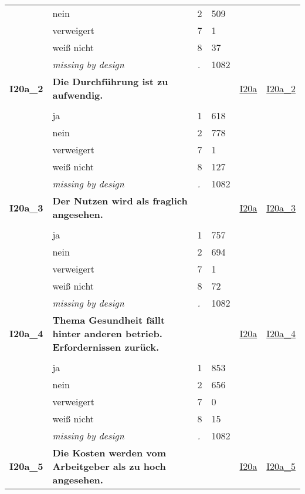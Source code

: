 \begin{longtable}{| L{2.45cm} | L{6cm} | C{1.5cm} | R{1cm} | C{2.25cm} | C{2.25cm} |}
   & nein & 2 & 509 &  &  \\ 
   & verweigert & 7 & 1 &  &  \\ 
   & weiß nicht & 8 & 37 &  &  \\ 
   & \textit{missing by design} & \textit{.} & 1082 &  &  \\ 
   \midrule
\textbf{I20a\_2}\label{var:I20a:2} & \textbf{Die Durchführung ist zu aufwendig.} &  &  & \hyperref[I20a]{I20a} & \hyperref[var:suf:I20a:2]{I20a\_2} \\ 
   &  &  &  &  &  \\ 
   & ja & 1 & 618 &  &  \\ 
   & nein & 2 & 778 &  &  \\ 
   & verweigert & 7 & 1 &  &  \\ 
   & weiß nicht & 8 & 127 &  &  \\ 
   & \textit{missing by design} & \textit{.} & 1082 &  &  \\ 
   \midrule
\textbf{I20a\_3}\label{var:I20a:3} & \textbf{Der Nutzen wird als fraglich angesehen.} &  &  & \hyperref[I20a]{I20a} & \hyperref[var:suf:I20a:3]{I20a\_3} \\ 
   &  &  &  &  &  \\ 
   & ja & 1 & 757 &  &  \\ 
   & nein & 2 & 694 &  &  \\ 
   & verweigert & 7 & 1 &  &  \\ 
   & weiß nicht & 8 & 72 &  &  \\ 
   & \textit{missing by design} & \textit{.} & 1082 &  &  \\ 
   \midrule
\textbf{I20a\_4}\label{var:I20a:4} & \textbf{Thema Gesundheit fällt hinter anderen betrieb. Erfordernissen zurück.} &  &  & \hyperref[I20a]{I20a} & \hyperref[var:suf:I20a:4]{I20a\_4} \\ 
   &  &  &  &  &  \\ 
   & ja & 1 & 853 &  &  \\ 
   & nein & 2 & 656 &  &  \\ 
   & verweigert & 7 & 0 &  &  \\ 
   & weiß nicht & 8 & 15 &  &  \\ 
   & \textit{missing by design} & \textit{.} & 1082 &  &  \\ 
   \midrule
\textbf{I20a\_5}\label{var:I20a:5} & \textbf{Die Kosten werden vom Arbeitgeber als zu hoch angesehen.} &  &  & \hyperref[I20a]{I20a} & \hyperref[var:suf:I20a:5]{I20a\_5} \\ 

\end{longtable}
